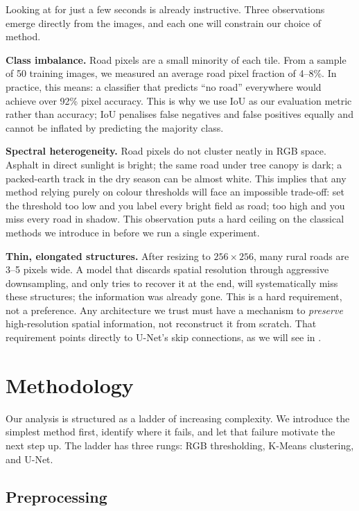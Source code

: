 \documentclass[conference]{IEEEtran}
\begin{document}
Looking at  for just a few seconds is already instructive.
Three observations emerge directly from the images, and each one will constrain our choice
of method.

\textbf{Class imbalance.}
Road pixels are a small minority of each tile.
From a sample of 50 training images, we measured an average road pixel fraction of 4--8\%.
In practice, this means: a classifier that predicts ``no road'' everywhere
would achieve over 92\% pixel accuracy.
This is why we use IoU as our evaluation metric rather than accuracy; IoU penalises false
negatives and false positives equally and cannot be inflated by predicting the majority class.

\textbf{Spectral heterogeneity.}
Road pixels do not cluster neatly in RGB space.
Asphalt in direct sunlight is bright; the same road under tree canopy is dark;
a packed-earth track in the dry season can be almost white.
This implies that any method relying purely on colour thresholds will face an impossible
trade-off: set the threshold too low and you label every bright field as road;
too high and you miss every road in shadow.
This observation puts a hard ceiling on the classical methods we introduce in
 before we run a single experiment.

\textbf{Thin, elongated structures.}
After resizing to $256 \times 256$, many rural roads are 3--5 pixels wide.
A model that discards spatial resolution through aggressive downsampling, and only tries to
recover it at the end, will systematically miss these structures; the information was already
gone.
This is a hard requirement, not a preference.
Any architecture we trust must have a mechanism to \textit{preserve} high-resolution spatial
information, not reconstruct it from scratch.
That requirement points directly to U-Net's skip connections,
as we will see in .

\section{Methodology}
\label{sec:method}

Our analysis is structured as a ladder of increasing complexity.
We introduce the simplest method first, identify where it fails, and let that failure motivate
the next step up.
The ladder has three rungs: RGB thresholding, K-Means clustering, and U-Net.

\subsection{Preprocessing}
\end{document}
